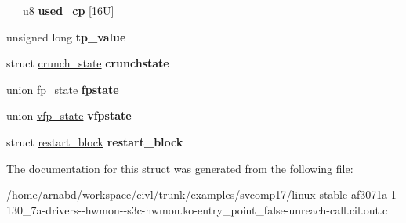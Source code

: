 \begin{DoxyCompactItemize}
\item 
\hypertarget{structthread__info_a661dd54576d14d7b71b8bc5bef319955}{}\+\_\+\+\_\+u8 {\bfseries used\+\_\+cp} \mbox{[}16\+U\mbox{]}\label{structthread__info_a661dd54576d14d7b71b8bc5bef319955}

\item 
\hypertarget{structthread__info_aabb5498049cfb0733bf557cf465f953b}{}unsigned long {\bfseries tp\+\_\+value}\label{structthread__info_aabb5498049cfb0733bf557cf465f953b}

\item 
\hypertarget{structthread__info_a52b8728580daca6669b1e4cd830606ad}{}struct \hyperlink{structcrunch__state}{crunch\+\_\+state} {\bfseries crunchstate}\label{structthread__info_a52b8728580daca6669b1e4cd830606ad}

\item 
\hypertarget{structthread__info_aa7b39e387faf889a947a40d421251b16}{}union \hyperlink{unionfp__state}{fp\+\_\+state} {\bfseries fpstate}\label{structthread__info_aa7b39e387faf889a947a40d421251b16}

\item 
\hypertarget{structthread__info_a3182fe99f0145651fe3b23b91b9e3b06}{}union \hyperlink{unionvfp__state}{vfp\+\_\+state} {\bfseries vfpstate}\label{structthread__info_a3182fe99f0145651fe3b23b91b9e3b06}

\item 
\hypertarget{structthread__info_a48f76d0d7ea6d4447a77366f74b4b6ed}{}struct \hyperlink{structrestart__block}{restart\+\_\+block} {\bfseries restart\+\_\+block}\label{structthread__info_a48f76d0d7ea6d4447a77366f74b4b6ed}

\end{DoxyCompactItemize}


The documentation for this struct was generated from the following file\+:\begin{DoxyCompactItemize}
\item 
/home/arnabd/workspace/civl/trunk/examples/svcomp17/linux-\/stable-\/af3071a-\/1-\/130\+\_\+7a-\/drivers-\/-\/hwmon-\/-\/s3c-\/hwmon.\+ko-\/entry\+\_\+point\+\_\+false-\/unreach-\/call.\+cil.\+out.\+c\end{DoxyCompactItemize}
